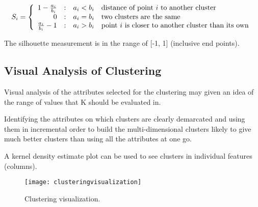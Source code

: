 	\begin{equation}
		S_i = \left\{ \begin{array}{r@{\quad : \quad}ll}
									1-\frac{a_i}{b_i}    &   a_i < b_i  & \text{distance of point $i$ to another cluster}    \\
                                            0            &   a_i = b_i  & \text{two clusters are the same}    \\
                                    \frac{a_i}{b_i}-1    &   a_i > b_i  & \text{point $i$ is closer to another cluster than its own}    \\
                      \end{array}\right.
	\end{equation}

The silhouette measurement is in the range of [-1, 1] (inclusive end points).

	\subsection{Visual Analysis of Clustering}
	\begin{bulletedlist}
		\item Visual analysis of the attributes selected for the clustering may given an idea of the range of values that K should be evaluated in.
		\item Identifying the attributes on which clusters are clearly demarcated and using them in incremental order to build the multi-dimensional clusters likely to give much better clusters than using all the attributes at one go.
		\item A kernel density estimate plot can be used to see clusters in individual features (columns).
	\end{bulletedlist}

	\begin{figure}[h]
		\centering
		\texttt{[image: clusteringvisualization]}
		\caption[Clustering visualization]{Clustering visualization.}
		\label{fig:clusteringvisualization}
	\end{figure}

